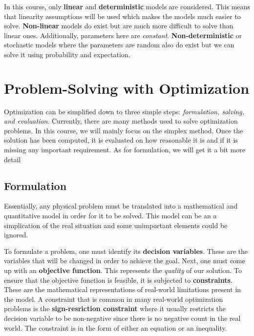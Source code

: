 In this course, only \textbf{linear} and \textbf{deterministic} models are
considered. This means that linearity assumptions will be used which makes the
models much easier to solve. \textbf{Non-linear} models do exist but are much
more difficult to solve than linear ones. Additionally, parameters here are
\textit{constant}. \textbf{Non-deterministic} or stochastic models where the 
parameters are random also do exist but we can solve it using probability and
expectation.

\section{Problem-Solving with Optimization}

Optimization can be simplified down to three simple steps: \textit{formulation, 
solving, and evaluation}. Currently, there are many methods used to solve
optimization problems. In this course, we will mainly focus on the simplex method.
Once the solution has been computed, it is evaluated on how reasonable it is and
if it is missing any important requirement. As for formulation, we will get it
a bit more detail

\subsection*{Formulation}

Essentially, any physical problem must be translated into a mathematical and
quantitative model in order for it to be solved. This model can be an a simplication
of the real situation and some unimportant elements could be ignored.

To formulate a problem, one must identify its \textbf{decision variables}. These
are the variables that will be changed in order to achieve the goal. Next, one 
must come up with an \textbf{objective function}. This represents the \textit{quality}
of our solution. To ensure that the objective function is feasible, it is
subjected to \textbf{constraints}. These are the mathematical representations of 
real-world limitations present in the model. A constraint that is common in many 
real-world optimization problems is the \textbf{sign-resriction constraint} where 
it usually restricts the decision variable to be non-negative since there is no 
negative count in the real world. The constraint is in the form of either an equation
or an inequality.


